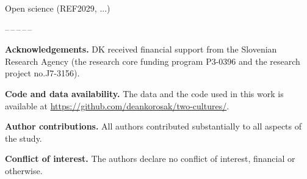 \documentclass[amsfonts, amssymb, prl, superscriptaddress, notitlepage, twocolumn, nofootinbib]{revtex4-2}
\begin{document}
Open science (REF2029, ...)
  
\begin{center}
--\,--\,--\,--\,--
\end{center}
\vspace{1mm}
\noindent\textbf{Acknowledgements.} DK received financial support from the Slovenian Research Agency (the research core funding program P3-0396 and the research project no.J7-3156). 

\noindent\textbf{Code and data availability.} The data and the code used in this work is available at \url{https://github.com/deankorosak/two-cultures/}.

\noindent\textbf{Author contributions.} All authors contributed substantially to all aspects of the study.

\noindent\textbf{Conflict of interest.} The authors declare no conflict of interest, financial or otherwise.


{}

\end{document}
